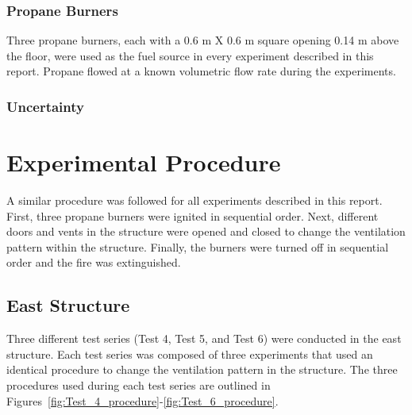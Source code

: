 \documentclass[12pt,oneside]{book}
\begin{document}
\subsection{Propane Burners}
\label{sec:Burners}
Three propane burners, each with a 0.6 m X 0.6 m square opening 0.14 m above the floor, were used as the fuel source in every experiment described in this report. Propane flowed at a known volumetric flow rate during the experiments.

\subsection{Uncertainty}
\label{sec:Uncertainty}

\chapter{Experimental Procedure}
\label{chap:Experimental_Procedure}
A similar procedure was followed for all experiments described in this report. First, three propane burners were ignited in sequential order. Next, different doors and vents in the structure were opened and closed to change the ventilation pattern within the structure. Finally, the burners were turned off in sequential order and the fire was extinguished. 

\section{East Structure}
\label{sec:East_exps}
Three different test series (Test 4, Test 5, and Test 6) were conducted in the east structure. Each test series was composed of three experiments that used an identical procedure to change the ventilation pattern in the structure. The three procedures used during each test series are outlined in Figures~\ref{fig:Test_4_procedure}-\ref{fig:Test_6_procedure}.

\end{document}
